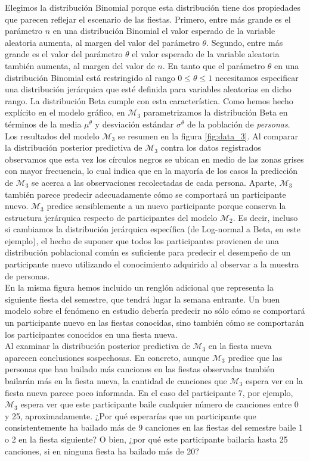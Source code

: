 \documentclass{article}
\begin{document}
\indent Elegimos la distribución Binomial porque esta distribución tiene dos propiedades que parecen reflejar el escenario de las fiestas. Primero, entre más grande es el parámetro $n$ en una distribución Binomial el valor esperado de la variable aleatoria aumenta, al margen del valor del parámetro $\theta$. Segundo, entre más grande es el valor del parámetro $\theta$ el valor esperado de la variable aleatoria también aumenta, al margen del valor de $n$. En tanto que el parámetro $\theta$ en una distribución Binomial está restringido al rango $0\leq\theta\leq1$ necesitamos especificar una distribución jerárquica que esté definida para variables aleatorias en dicho rango. La distribución Beta cumple con esta característica. Como hemos hecho explícito en el modelo gráfico, en $\mathcal M_3$ parametrizamos la distribución Beta en términos de la media $\mu^\theta$ y desviación estándar $\sigma^\theta$ de la población de \emph{personas}.\\ 
\indent Los resultados del modelo $\mathcal M_3$ se resumen en la figura \ref{fig:data_3}. Al comparar la distribución posterior predictiva de $\mathcal M_3$ contra los datos registrados observamos que esta vez los círculos negros se ubican en medio de las zonas grises con mayor frecuencia, lo cual indica que en la mayoría de los casos la predicción de $\mathcal M_3$ se acerca a las observaciones recolectadas de cada persona. Aparte, $\mathcal M_3$ también parece predecir adecuadamente cómo se comportará un participante nuevo. $\mathcal M_3$ predice sensiblemente a un nuevo participante porque conserva la estructura jerárquica respecto de participantes del modelo $\mathcal M_2$. Es decir, incluso si cambiamos la distribución jerárquica específica (de Log-normal a Beta, en este ejemplo), el hecho de suponer que todos los participantes provienen de una distribución poblacional común es suficiente para predecir el desempeño de un participante nuevo utilizando el conocimiento adquirido al observar a la muestra de personas.\\
\indent En la misma figura hemos incluido un renglón adicional que representa la siguiente fiesta del semestre, que tendrá lugar la semana entrante. Un buen modelo sobre el fenómeno en estudio debería predecir no sólo cómo se comportará un participante nuevo en las fiestas conocidas, sino también cómo se comportarán los participantes conocidos en una fiesta nueva.\\
\indent Al examinar la distribución posterior predictiva de $\mathcal M_3$ en la fiesta nueva aparecen conclusiones sospechosas. En concreto, aunque $\mathcal M_3$ predice que las personas que han bailado más canciones en las fiestas observadas también bailarán más en la fiesta nueva, la cantidad de canciones que $\mathcal M_3$ espera ver en la fiesta nueva parece poco informada. En el caso del participante 7, por ejemplo, $\mathcal M_3$ espera ver que este participante baile cualquier número de canciones entre 0 y 25, aproximadamente. ¿Por qué esperarías que un participante que consistentemente ha bailado más de 9 canciones en las fiestas del semestre baile 1 o 2 en la fiesta siguiente? O bien, ¿por qué este participante bailaría hasta 25 canciones, si en ninguna fiesta ha bailado más de 20?\\
\end{document}
